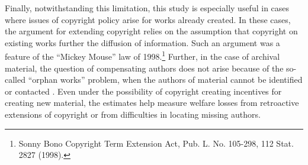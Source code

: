 \documentclass[11pt]{article}
\begin{document}
Finally, notwithstanding this limitation, this study is especially useful in cases where issues of copyright policy arise for works already created. In these cases, the argument for extending copyright relies on the assumption that copyright on existing works further the diffusion of information. Such an argument was a feature of the ``Mickey Mouse'' law of 1998.\footnote{Sonny Bono Copyright Term Extension Act, Pub. L. No. 105-298, 112 Stat. 2827 (1998).} Further, in the case of archival material, the question of compensating authors does not arise because of the so-called ``orphan works'' problem, when the authors of material cannot be identified or contacted \citep{smith_analysis_2012}. Even under the possibility of copyright creating incentives for creating new material, the estimates help measure welfare losses from retroactive extensions of copyright or from difficulties in locating missing authors. 



\baselineskip 14.2pt




%

%
\end{document}
